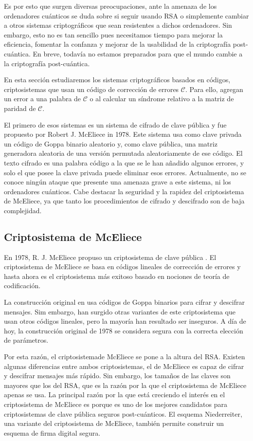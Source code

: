 Es por esto que surgen diversas preocupaciones, ante la amenaza de los ordenadores cuánticos se duda sobre si seguir usando RSA o simplemente cambiar a otros sistemas criptográficos que sean resistentes a dichos ordenadores. Sin embargo, esto no es tan sencillo pues necesitamos tiempo para mejorar la eficiencia, fomentar la confanza y mejorar de la usabilidad de la criptografía post-cuántica. En breve, todavía no estamos preparados para que el mundo cambie a la criptografía post-cuántica.

En esta sección estudiaremos los sistemas criptográficos basados en códigos, criptosistemas que usan un código de corrección de errores $\mathcal{C}$. Para ello, agregan un error a una palabra de $\mathcal{C}$ o al calcular un síndrome relativo a la matriz de paridad de $\mathcal{C}$.

El primero de esos sistemas es un sistema de cifrado de clave pública y fue propuesto por Robert J. McEliece in 1978. Este sistema usa como clave privada un código de Goppa binario aleatorio y, como clave pública, una matriz generadora aleatoria de una versión permutada aleatoriamente de ese código. El texto cifrado es una palabra código a la que se le han añadido algunos errores, y solo el que posee la clave privada puede eliminar esos errores. Actualmente, no se conoce ningún ataque que presente una amenaza grave a este sistema, ni los ordenadores cuánticos. Cabe destacar la seguridad y la rapidez del criptosistema de McEliece, ya que tanto los procedimientos de cifrado y descifrado son de baja complejidad.

\subsection{Criptosistema de McEliece}

En 1978, R. J. McEliece propuso un criptosistema de clave pública \cite{McEliece_1978}. El criptosistema de McEliece se basa en códigos lineales de corrección de errores y hasta ahora es el criptosistema más exitoso basado en nociones de teoría de codificación.

La construcción original en \cite{McEliece_1978} usa códigos de Goppa binarios para cifrar y descifrar mensajes. Sim embargo, han surgido otras variantes de este criptosistema que usan otros códigos lineales, pero la mayoría han resultado ser inseguros. A día de hoy, la construcción original de 1978 se considera segura con la correcta elección de parámetros.

Por esta razón, el criptosistemade McEliece se pone a la altura del RSA. Existen algunas diferencias entre ambos criptosistemas, el de McEliece es capaz de cifrar y descifrar mensajes más rápido. Sin embargo, los tamaños de las claves son mayores que los del RSA, que es la razón por la que el criptosistema de McEliece apenas se usa. La principal razón por la que está creciendo el interés en el criptosistema de McEliece es porque es uno de los mejores candidatos para criptosistemas de clave pública seguros post-cuánticos. El esquema Niederreiter, una variante del criptosistema de McEliece, también permite construir un esquema de firma digital segura.

